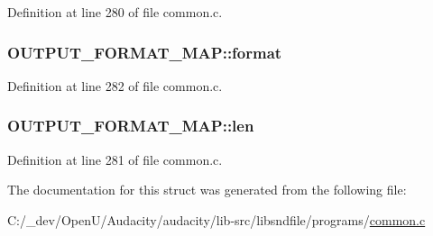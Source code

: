 Definition at line 280 of file common.\+c.

\subsubsection[{\texorpdfstring{format}{format}}]{ O\+U\+T\+P\+U\+T\+\_\+\+F\+O\+R\+M\+A\+T\+\_\+\+M\+A\+P\+::format}\hypertarget{struct_o_u_t_p_u_t___f_o_r_m_a_t___m_a_p_afdfa185f8b133270305131925e06b168}{}\label{struct_o_u_t_p_u_t___f_o_r_m_a_t___m_a_p_afdfa185f8b133270305131925e06b168}


Definition at line 282 of file common.\+c.

\subsubsection[{\texorpdfstring{len}{len}}]{ O\+U\+T\+P\+U\+T\+\_\+\+F\+O\+R\+M\+A\+T\+\_\+\+M\+A\+P\+::len}\hypertarget{struct_o_u_t_p_u_t___f_o_r_m_a_t___m_a_p_a551e605a9b11c5962d7379e799541321}{}\label{struct_o_u_t_p_u_t___f_o_r_m_a_t___m_a_p_a551e605a9b11c5962d7379e799541321}


Definition at line 281 of file common.\+c.



The documentation for this struct was generated from the following file\+:\begin{DoxyCompactItemize}
\item 
C\+:/\+\_\+dev/\+Open\+U/\+Audacity/audacity/lib-\/src/libsndfile/programs/\hyperlink{programs_2common_8c}{common.\+c}\end{DoxyCompactItemize}

